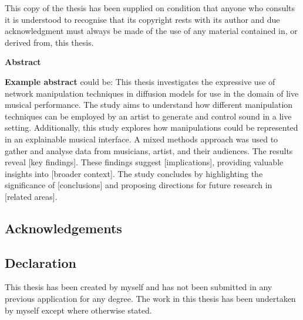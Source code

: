 \setcounter{page}{2}

This copy of the thesis has been supplied on condition that anyone who consults it is understood to recognise that its copyright rests with its author and due acknowledgment must always be made of the use of any material contained in, or derived from, this thesis.
\pagebreak

\begin{center}
\textbf{Abstract}
\end{center}


\textbf{Example abstract} could be: 
This thesis investigates the expressive use of network manipulation techniques in diffusion models for use in the domain of live musical performance.
The study aims to understand how different manipulation techniques can be employed by an artist to generate and control sound in a live setting. 
Additionally, this study explores how manipulations could be represented in an explainable musical interface. 
A mixed methods approach was used to gather and analyse data from musicians, artist, and their audiences. 
The results reveal [key findings]. These findings suggest [implications], providing valuable insights into [broader context]. 
The study concludes by highlighting the significance of [conclusions] and proposing directions for future research in [related areas].

\pagebreak





\setcounter{tocdepth}{2}
\tableofcontents
{}
\pagebreak



\listoffigures
{}
\pagebreak


\listoftables
{}
\pagebreak



\subsection*{Acknowledgements}



\pagebreak


\subsection*{Declaration}

This thesis has been created by myself and has not been submitted in any previous application for any degree. The work in this thesis has been undertaken by myself except where otherwise stated.

\pagebreak
